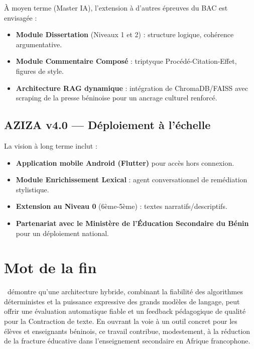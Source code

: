 À moyen terme (Master IA), l'extension à d'autres épreuves du BAC est envisagée :

\begin{itemize}
    \item \textbf{Module Dissertation} (Niveaux 1 et 2) : structure logique, cohérence argumentative.
    \item \textbf{Module Commentaire Composé} : triptyque Procédé-Citation-Effet, figures de style.
    \item \textbf{Architecture RAG dynamique} : intégration de ChromaDB/FAISS avec scraping de la presse béninoise pour un ancrage culturel renforcé.
\end{itemize}

\subsection*{AZIZA v4.0 — Déploiement à l'échelle}

La vision à long terme inclut :

\begin{itemize}
    \item \textbf{Application mobile Android (Flutter)} pour accès hors connexion.
    \item \textbf{Module Enrichissement Lexical} : agent conversationnel de remédiation stylistique.
    \item \textbf{Extension au Niveau 0} (6ème-5ème) : textes narratifs/descriptifs.
    \item \textbf{Partenariat avec le Ministère de l'Éducation Secondaire du Bénin} pour un déploiement national.
\end{itemize}

\section*{Mot de la fin}

\AZIZA\ démontre qu'une architecture hybride, combinant la fiabilité des algorithmes déterministes et la puissance expressive des grands modèles de langage, peut offrir une évaluation automatique fiable et un feedback pédagogique de qualité pour la Contraction de texte. En ouvrant la voie à un outil concret pour les élèves et enseignants béninois, ce travail contribue, modestement, à la réduction de la fracture éducative dans l'enseignement secondaire en Afrique francophone.
